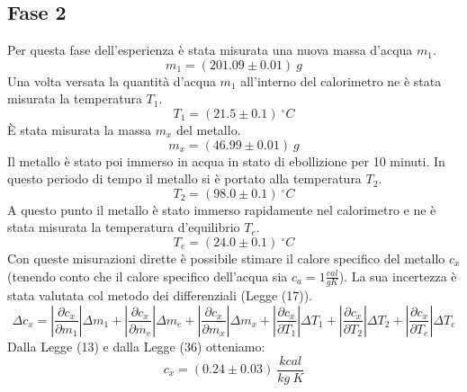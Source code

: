 \subsection{Fase 2}
Per questa fase dell'esperienza è stata misurata una nuova massa d'acqua $m_1$.
\begin{equation}
	m_1=(201.09\pm 0.01)\ g
\end{equation}
Una volta versata la quantità d'acqua $m_1$ all'interno del calorimetro ne è stata misurata la temperatura $T_1$.
\begin{equation}
	T_1=(21.5\pm 0.1)\ ^{\circ}C
\end{equation}
È stata misurata la massa $m_x$ del metallo.
\begin{equation}
	m_x=(46.99\pm 0.01)\ g
\end{equation}
Il metallo è stato poi immerso in acqua in stato di ebollizione per 10 minuti. In questo periodo di tempo il metallo si è portato alla temperatura $T_2$.
\begin{equation}
	T_2=(98.0\pm 0.1)\ ^{\circ}C
\end{equation}
A questo punto il metallo è stato immerso rapidamente nel calorimetro e ne è stata misurata la temperatura d'equilibrio $T_e$.
\begin{equation}
	T_e=(24.0\pm 0.1)\ ^{\circ}C
\end{equation}
Con queste misurazioni dirette è possibile stimare il calore specifico del metallo $c_x$ (tenendo conto che il calore specifico dell'acqua sia $c_a=1\frac{cal}{gK}$). La sua incertezza è stata valutata col metodo dei differenziali (Legge (17)).
\begin{equation}
	\Delta c_x=\left|\frac{\partial c_x}{\partial m_1} \right|\Delta m_1 + \left|\frac{\partial c_x}{\partial m_e} \right|\Delta m_e + \left|\frac{\partial c_x}{\partial m_x} \right|\Delta m_x + \left|\frac{\partial c_x}{\partial T_1} \right|\Delta T_1 + \left|\frac{\partial c_x}{\partial T_2} \right|\Delta T_2 + \left|\frac{\partial c_x}{\partial T_e} \right|\Delta T_e
\end{equation}
Dalla Legge (13) e dalla Legge (36) otteniamo:
\begin{equation}
	c_x=(0.24\pm 0.03)\ \frac{kcal}{kg\ K}
\end{equation}






